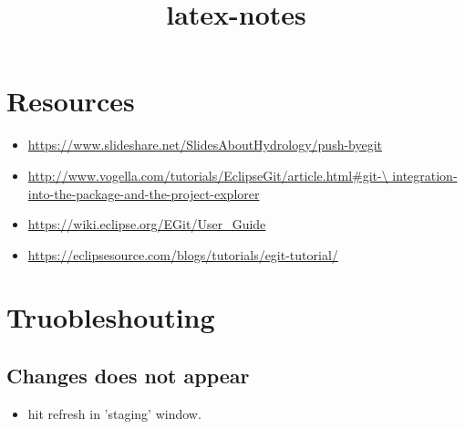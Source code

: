 \documentclass{report}
\title{latex-notes}
\begin{document}
\tableofcontents




\part{Resources}
\begin{itemize}
  \item \url{https://www.slideshare.net/SlidesAboutHydrology/push-byegit}
  \item \url{http://www.vogella.com/tutorials/EclipseGit/article.html#git-\
  integration-into-the-package-and-the-project-explorer}
  \item \url{https://wiki.eclipse.org/EGit/User_Guide}
  \item \url{https://eclipsesource.com/blogs/tutorials/egit-tutorial/}
\end{itemize}




\part{Truobleshouting}



\chapter{Changes does not appear}
\begin{itemize}
  \item hit refresh in 'staging' window.
\end{itemize}
\end{document}
